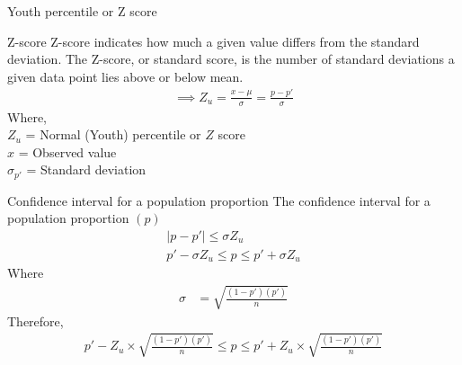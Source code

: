 \documentclass{beamer}
\begin{document}
\begin{frame}{Youth percentile or Z score}
    \begin{block}{Z-score}
       Z-score indicates how much a given value differs from the
    standard deviation. The Z-score, or standard score, is the number of standard deviations a given data point lies above or below mean.
    \begin{align}
        \implies Z_u = \frac{x-\mu}{\sigma} = \frac{p-p'}{\sigma}
    \end{align}
     Where,\\
        $Z_u$ = Normal (Youth) percentile or $Z$ score\\
        $ x $ = Observed value\\
        $\sigma_{p'} $ = Standard deviation
        
    \end{block}
\end{frame}
\begin{frame}{}
     \begin{block}{Confidence interval for a population proportion}
        The confidence interval for a population proportion $(p)$
        \begin{align}
        | p-p' | \leq \sigma Z_u\\
        p'-\sigma Z_u \leq p \leq p'+\sigma Z_u
        \end{align}
        Where
        \begin{align}
            \sigma &= \sqrt{\frac{(1-p')(p')}{n}}
        \end{align}
    Therefore,
        \begin{align}
           p' - Z_u \times \sqrt{\frac{(1-p')(p')}{n}} \leq p \leq p' + Z_u \times \sqrt{\frac{(1-p')(p')}{n}}\label{4}
        \end{align}
    \end{block}
\end{frame}
\end{document}
